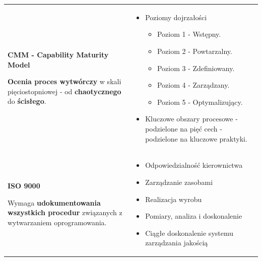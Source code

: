 \documentclass[a4paper]{article}
\begin{document}
    \begin{table}[H]
        \begin{center}
            \begin{tabular}{ p{7cm} | p{9cm}  }

                \textbf{CMM - Capability Maturity Model}

                \textbf{Ocenia proces wytwórczy} w skali pięciostopniowej - od \textbf{chaotycznego} do \textbf{ścisłego}.
                &
                \begin{itemize}
                    \item Poziomy dojrzałości
                    \begin{itemize}
                        \item Poziom 1 - Wstępny.
                        \item Poziom 2 - Powtarzalny.
                        \item Poziom 3 - Zdefiniowany.
                        \item Poziom 4 - Zarządzany.
                        \item Poziom 5 - Optymalizujący.
                    \end{itemize}

                    \item Kluczowe obszary procesowe - podzielone na pięć cech - podzielone na kluczowe praktyki.
                \end{itemize}
                \\

                \cmidrule(r){1-1}\cmidrule(l){2-2}

                \textbf{ISO 9000}

                Wymaga \textbf{udokumentowania wszystkich procedur} związanych z wytwarzaniem oprogramowania.
                &
                \begin{itemize}
                    \item Odpowiedzialność kierownictwa
                    \item Zarządzanie zasobami
                    \item Realizacja wyrobu
                    \item Pomiary, analiza i doskonalenie
                    \item Ciągłe doskonalenie systemu zarządzania jakością
                \end{itemize}
                \\
            \end{tabular}
        \end{center}
    \end{table}
\end{document}
